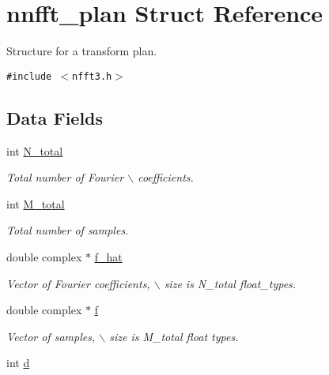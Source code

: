 \hypertarget{structnnfft__plan}{
\section{nnfft\_\-plan Struct Reference}
\label{structnnfft__plan}
}
Structure for a transform plan.  


{\tt \#include $<$nfft3.h$>$}

\subsection*{Data Fields}
\begin{CompactItemize}
\item 
\hypertarget{structnnfft__plan_o0}{
int \hyperlink{structnnfft__plan_o0}{N\_\-total}}
\label{structnnfft__plan_o0}

\begin{CompactList}\small\item\em Total number of Fourier $\backslash$ coefficients. \item\end{CompactList}\item 
\hypertarget{structnnfft__plan_o1}{
int \hyperlink{structnnfft__plan_o1}{M\_\-total}}
\label{structnnfft__plan_o1}

\begin{CompactList}\small\item\em Total number of samples. \item\end{CompactList}\item 
\hypertarget{structnnfft__plan_o2}{
double complex $\ast$ \hyperlink{structnnfft__plan_o2}{f\_\-hat}}
\label{structnnfft__plan_o2}

\begin{CompactList}\small\item\em Vector of Fourier coefficients, $\backslash$ size is N\_\-total float\_\-types. \item\end{CompactList}\item 
\hypertarget{structnnfft__plan_o3}{
double complex $\ast$ \hyperlink{structnnfft__plan_o3}{f}}
\label{structnnfft__plan_o3}

\begin{CompactList}\small\item\em Vector of samples, $\backslash$ size is M\_\-total float types. \item\end{CompactList}\item 
\hypertarget{structnnfft__plan_o4}{
int \hyperlink{structnnfft__plan_o4}{d}}
\label{structnnfft__plan_o4}


\end{CompactItemize}
